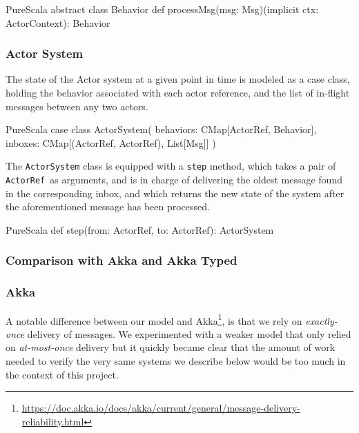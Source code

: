 \documentclass[a4paper,twoside]{article}
\newcommand{\InlineS}[1]{\lstinline[language=PureScala,basicstyle=\small\ttfamily,columns=fixed]|#1|}
\newcommand{\ActorRef}{\InlineS{ActorRef}\ }
\begin{document}
\begin{ShortCode}{PureScala}
abstract class Behavior {
  def processMsg(msg: Msg)(implicit ctx: ActorContext): Behavior
}
\end{ShortCode}

\vspace{-15pt}
\subsubsection*{Actor System}

The state of the Actor system at a given point in time is modeled as a case class, 
holding the behavior associated with each actor reference, and the list of in-flight messages between any two actors.

\begin{ShortCode}{PureScala}
case class ActorSystem(
  behaviors: CMap[ActorRef, Behavior],
  inboxes: CMap[(ActorRef, ActorRef), List[Msg]]
)
\end{ShortCode}

The \InlineS{ActorSystem} class is equipped with a \InlineS{step} method, which takes 
a pair of \ActorRef as arguments, and is in charge of delivering the oldest message 
found in the corresponding inbox, and which returns the new state of the system after 
the aforementioned message has been processed.

\begin{ShortCode}{PureScala}
def step(from: ActorRef, to: ActorRef): ActorSystem
\end{ShortCode}

\subsubsection{Comparison with Akka and Akka Typed}
\label{comp}

\subsubsection*{Akka}

A notable difference between our model and Akka\footnote{\url{https://doc.akka.io/docs/akka/current/general/message-delivery-reliability.html}}, is that we rely on \textit{exactly-once} delivery of messages. We experimented with a weaker model that only relied on \textit{at-most-once} delivery but it quickly became clear that the amount of work needed to verify the very same systems we describe below would be too much in the context of this project.
\end{document}
